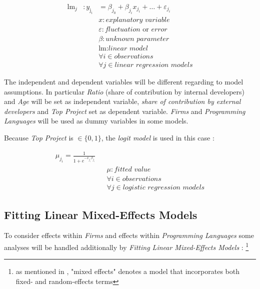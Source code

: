 \begin{align}
	 \text{lm}_{j} &: y_{\text{j}_{i}} &= \beta_{j_{0}} + \beta_{j_{i}} x_{j_{i}} + \dots + \varepsilon_{j_{i}} \\
	 & & x : \textit{explanatory variable} \nonumber \\
	 & & \varepsilon : \textit{fluctuation} \text{ or } \textit{error} \nonumber \\
	 & & \beta : \textit{unknown parameter} \nonumber \\
	 & & \text{lm} : \textit{linear model} \nonumber \\
	 & & \forall i \in \textit{observations} \nonumber \\
	 & & \forall j \in \textit{linear regression models} \nonumber
\end{align}

The independent and dependent variables will be different regarding to model assumptions. In particular \textit{Ratio} (share of contribution by internal developers) and \textit{Age} will be set as independent variable, \textit{share of contribution by external developers} and \textit{Top Project} set as dependent variable. \textit{Firms} and \textit{Programming Languages} will be used as dummy variables in some models.

Because \textit{Top Project} is $\in \{0, 1\}$, the \textit{logit model} is used in this case \cite[p.23]{hilbe2009logistic}:

\begin{align}
	 \mu_{j_{i}} = \frac{ 1 }{ 1 + e^{-x_{j_{i}} \beta_{j_i}} } \\
	 & & \mu : \textit{fitted value} \nonumber \\
	 & & \forall i \in \textit{observations} \nonumber \\
	 & & \forall j \in \textit{logistic regression models} \nonumber
\end{align}

\subsection{Fitting Linear Mixed-Effects Models}

To consider effects within \textit{Firms} and effects within \textit{Programming Languages} some analyses will be handled additionally by \textit{Fitting Linear Mixed-Effects Models} \cite[p.13]{R_lme4}: \footnote{as mentioned in \cite[p.1]{R_lme4}, "mixed effects" denotes a model that incorporates both fixed- and random-effects terms}

